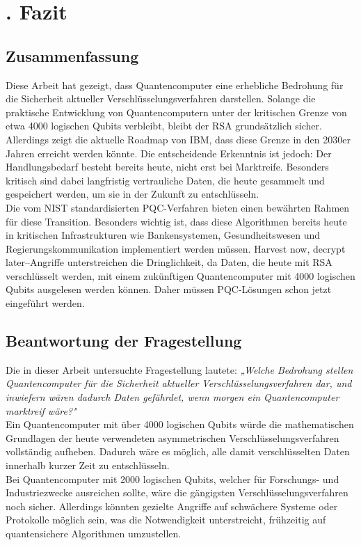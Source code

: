 \chapter*{\thechapter. Fazit}

\section{Zusammenfassung}
Diese Arbeit hat gezeigt, dass Quantencomputer eine erhebliche Bedrohung für die Sicherheit aktueller Verschlüsselungsverfahren darstellen.
Solange die praktische Entwicklung von Quantencomputern unter der kritischen Grenze von etwa 4000 logischen Qubits verbleibt, bleibt der RSA grundsätzlich sicher. 
Allerdings zeigt die aktuelle Roadmap von IBM, dass diese Grenze in den 2030er Jahren erreicht werden könnte.
Die entscheidende Erkenntnis ist jedoch: Der Handlungsbedarf besteht bereits heute, nicht erst bei Marktreife. 
Besonders kritisch sind dabei langfristig vertrauliche Daten, die heute gesammelt und gespeichert werden, um sie in der Zukunft zu entschlüsseln.
\\
Die vom NIST standardisierten PQC-Verfahren bieten einen bewährten Rahmen für diese Transition. 
Besonders wichtig ist, dass diese Algorithmen bereits heute in kritischen Infrastrukturen wie Bankensystemen, Gesundheitswesen und Regierungskommunikation implementiert werden müssen. 
Harvest now, decrypt later--Angriffe unterstreichen die Dringlichkeit, da Daten, die heute mit RSA verschlüsselt werden, mit einem zukünftigen Quantencomputer mit 4000 logischen Qubits ausgelesen werden können.
Daher müssen PQC-Lösungen schon jetzt eingeführt werden. 

\section{Beantwortung der Fragestellung}
Die in dieser Arbeit untersuchte Fragestellung lautete: \textit{„Welche Bedrohung stellen Quantencomputer für die Sicherheit aktueller Verschlüsselungsverfahren dar, und inwiefern wären dadurch Daten gefährdet, wenn morgen ein Quantencomputer marktreif wäre?"}
\\
Ein Quantencomputer mit über 4000 logischen Qubits würde die mathematischen Grundlagen der heute verwendeten asymmetrischen Verschlüsselungsverfahren vollständig aufheben.
Dadurch wäre es möglich, alle damit verschlüsselten Daten innerhalb kurzer Zeit zu entschlüsseln. %
\\
Bei Quantencomputer mit 2000 logischen Qubits, welcher für Forschungs- und Industriezwecke ausreichen sollte, wäre die gängigsten Verschlüsselungsverfahren noch sicher. 
Allerdings könnten gezielte Angriffe auf schwächere Systeme oder Protokolle möglich sein, was die Notwendigkeit unterstreicht, frühzeitig auf quantensichere Algorithmen umzustellen.

